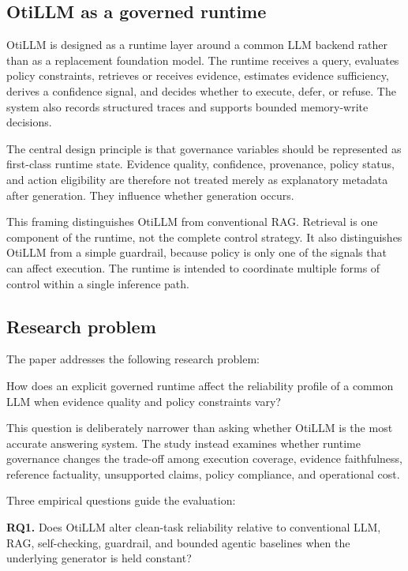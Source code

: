 \documentclass[manuscript, screen, review]{jair}
\begin{document}
\subsection{OtiLLM as a governed runtime}

OtiLLM is designed as a runtime layer around a common LLM backend rather than
as a replacement foundation model. The runtime receives a query, evaluates
policy constraints, retrieves or receives evidence, estimates evidence
sufficiency, derives a confidence signal, and decides whether to execute,
defer, or refuse. The system also records structured traces and supports
bounded memory-write decisions.

The central design principle is that governance variables should be represented
as first-class runtime state. Evidence quality, confidence, provenance, policy
status, and action eligibility are therefore not treated merely as explanatory
metadata after generation. They influence whether generation occurs.

This framing distinguishes OtiLLM from conventional RAG. Retrieval is one
component of the runtime, not the complete control strategy. It also
distinguishes OtiLLM from a simple guardrail, because policy is only one of the
signals that can affect execution. The runtime is intended to coordinate
multiple forms of control within a single inference path.

\subsection{Research problem}

The paper addresses the following research problem:

How does an explicit governed runtime affect the reliability profile of a
common LLM when evidence quality and policy constraints vary?

This question is deliberately narrower than asking whether OtiLLM is the most
accurate answering system. The study instead examines whether runtime
governance changes the trade-off among execution coverage, evidence faithfulness,
reference factuality, unsupported claims, policy compliance, and operational
cost.

Three empirical questions guide the evaluation:

\textbf{RQ1.} Does OtiLLM alter clean-task reliability relative to conventional LLM,
RAG, self-checking, guardrail, and bounded agentic baselines when the underlying
generator is held constant?
\end{document}
